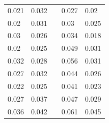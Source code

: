 \documentclass{article}
\begin{document}
\begin{table}[H]
\begin{tabular}{|p{4cm}|p{4cm}|p{0cm}|p{4cm}|p{4cm}|}
0.021 & 0.032 & & 0.027 & 0.02 \\ \cline{1-5}
0.02 & 0.031 & & 0.03 & 0.025 \\ \cline{1-5}
0.03 & 0.026 & & 0.034 & 0.018 \\ \cline{1-5}
0.02 & 0.025 & & 0.049 & 0.031 \\ \cline{1-5}
0.032 & 0.028 & & 0.056 & 0.031 \\ \cline{1-5}
0.027 & 0.032 & & 0.044 & 0.026 \\ \cline{1-5}
0.022 & 0.025 & & 0.041 & 0.023 \\ \cline{1-5}
0.027 & 0.037 & & 0.047 & 0.029 \\ \cline{1-5}
0.036 & 0.042 & & 0.061 & 0.045 \\ \cline{1-5}
\end{tabular}
\end{table}
\end{document}
